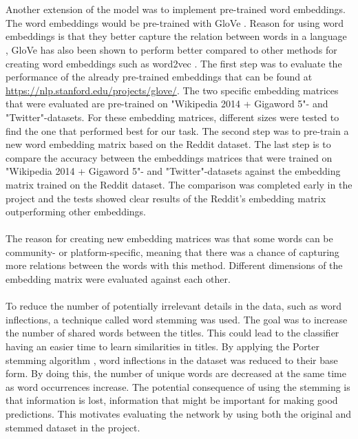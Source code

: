 \\\\
Another extension of the model was to implement pre-trained word embeddings. The word embeddings would be pre-trained with GloVe \parencite{pennington2014glove}. Reason for using word embeddings is that they better capture the relation between words in a language \parencite{mikolov2013linguistic}, GloVe has also been shown to perform better compared to other methods for creating word embeddings such as word2vec \parencite{pennington2014glove}. The first step was to evaluate the performance of the already pre-trained embeddings that can be found at \url{https://nlp.stanford.edu/projects/glove/}. The two specific embedding matrices that were evaluated are pre-trained on "Wikipedia 2014 + Gigaword 5"- and "Twitter"-datasets. For these embedding matrices, different sizes were tested to find the one that performed best for our task. The second step was to pre-train a new word embedding matrix based on the Reddit dataset. The last step is to compare the accuracy between the embeddings matrices that were trained on "Wikipedia 2014 + Gigaword 5"- and "Twitter"-datasets against the embedding matrix trained on the Reddit dataset. The comparison was completed early in the project and the tests showed clear results of the Reddit's embedding matrix outperforming other embeddings.
\\\\
The reason for creating new embedding matrices was that some words can be community- or platform-specific, meaning that there was a chance of capturing more relations between the words with this method. Different dimensions of the embedding matrix were evaluated against each other. 
\\\\
To reduce the number of potentially irrelevant details in the data, such as word inflections, a technique called word stemming was used. The goal was to increase the number of shared words between the titles. This could lead to the classifier having an easier time to learn similarities in titles. By applying the Porter stemming algorithm \parencite{porter1980algorithm}, word inflections in the dataset was reduced to their base form. By doing this, the number of unique words are decreased at the same time as word occurrences increase. The potential consequence of using the stemming is that information is lost, information that might be important for making good predictions. This motivates evaluating the network by using both the original and stemmed dataset in the project.
